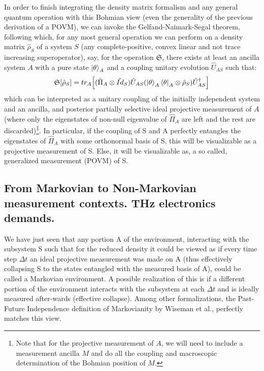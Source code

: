 \documentclass[11pt, a4paper]{article} %
\begin{document}
In order to finish integrating the density matrix formalism and any general quantum operation with this Bohmian view (even the generality of the previous derivation of a POVM), we can invoke the Gelfand-Naimark-Segal theorem, following which, for any most general operation we can perform on a density matrix $\hat{\rho}_S$ of a system $S$ (any complete-positive, convex linear and not trace increasing superoperator), say, for the operation $\mathfrak{S}$, there exists at least an ancilla system $A$ with a pure state $\ket{\theta}_A$ and a coupling unitary evolution $\hat{U}_{AS}$ such that:
\begin{equation}
\mathfrak{S}[\hat{\rho}_S]=tr_A\qty[ (\hat{\Pi}_A\otimes \hat{Id}_S)  \hat{U}_{AS}\qty(\ket{\theta}_A\bra{\theta}_A\otimes \hat{\rho}_S)\hat{U}_{AS}^\dagger]
\end{equation}
which can be interpreted as a unitary coupling of the initially independent system and an ancilla, and posterior partially selective ideal projective measurement of $A$ (where only the eigenstates of non-null eigenvalue of $\hat{\Pi}_A$ are left and the rest are discarded)\footnote{Note that for the projective measurement of $A$, we will need to include a measurement ancilla $M$ and do all the coupling and macroscopic determination of the Bohmian position of $M$.}. In particular, if the coupling of S and A perfectly entangles the eigenstates of $\hat{\Pi}_A$ with some orthonormal basis of S, this will be visualizable as a projective measurement of S. Else, it will be visualizable as, a so called, generalized measurement (POVM) of S.


\subsection*{From Markovian to Non-Markovian measurement contexts. THz electronics demands.}
We have just seen that any portion A of the environment, interacting with the subsystem S such that for the reduced density it could be viewed as if every time step $\Delta t$ an ideal projective measurement was made on A (thus effectively collapsing S to the states entangled with the measured basis of A), could be called a Markovian environment. A possible realization of this is if a different portion of the environment interacts with the subsystem at each $\Delta t$ and is ideally measured after-wards (effective collapse). Among other formalizations, the Past-Future Independence definition of Markovianity by Wiseman et al.\cite{MarkovianityDefs}, perfectly matches this view.
\end{document}
